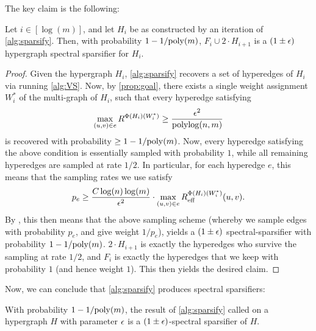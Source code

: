 \documentclass{article}
\begin{document}
The key claim is the following:

\begin{claim}\label{clm:oneRoundSparsifier}
Let $i \in [\log(m)]$, and let $H_i$ be as constructed by an iteration of \cref{alg:sparsify}. Then, with probability $1 - 1 / \mathrm{poly}(m)$, $F_i \cup 2 \cdot H_{i+1}$ is a $(1 \pm \epsilon)$ hypergraph spectral sparsifier for $H_i$.
\end{claim}

\begin{proof}
    Given the hypergraph $H_i$, \cref{alg:sparsify} recovers a set of hyperedges of $H_i$ via running \cref{alg:VS}. Now, by \cref{prop:goal}, there exists a single weight assignment $W^*_i$ of the multi-graph of $H_i$, such that every hyperedge satisfying 
    \[
    \max_{(u,v) \in e} R^{\Phi(H_i)(W^*_i)} \geq \frac{\epsilon^2}{\operatorname{polylog}(n,m)}
    \]
    is recovered with probability $\geq 1- 1 / \mathrm{poly}(m)$. Now, every hyperedge satisfying the above condition is essentially sampled with probability $1$, while all remaining hyperedges are sampled at rate $1/2$. In particular, for each hyperedge $e$, this means that the sampling rates we use satisfy
    \[
    p_e \geq \frac{C \log(n) \log(m)}{ \epsilon^2} \cdot \max_{(u,v) \in e} R_{\mathrm{eff}}^{\Phi(H_i)(W^*_i)}(u,v).
    \]
    By \cite{JambulapatiLS23}, this then means that the above sampling scheme (whereby we sample edges with probability $p_e$, and give weight $1 / p_e$), yields a $(1 \pm \epsilon)$ spectral-sparsifier with probability $1 -1 /\mathrm{poly}(m)$. $2 \cdot H_{i+1}$ is exactly the hyperedges who survive the sampling at rate $1/2$, and $F_i$ is exactly the hyperedges that we keep with probability $1$ (and hence weight $1$). This then yields the desired claim. 
\end{proof}

Now, we can conclude that \cref{alg:sparsify} produces spectral sparsifiers:

\begin{lemma}
    With probability $1 - 1 / \mathrm{poly}(m)$, the result of \cref{alg:sparsify} called on a hypergraph $H$ with parameter $\epsilon$ is a $(1 \pm \epsilon)$-spectral sparsifier of $H$. 
\end{lemma}
\end{document}
